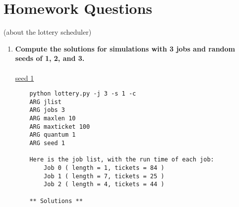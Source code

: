 \documentclass{article}
\begin{document}
\section*{Homework Questions}

(about the lottery scheduler)

\begin{enumerate}

    \item \textbf{Compute the solutions for simulations with 3 jobs and random seeds of 1, 2, and 3.}\\\\
    \underline{seed 1}
    \begin{verbatim}
    python lottery.py -j 3 -s 1 -c
    ARG jlist 
    ARG jobs 3
    ARG maxlen 10
    ARG maxticket 100
    ARG quantum 1
    ARG seed 1
    
    Here is the job list, with the run time of each job: 
        Job 0 ( length = 1, tickets = 84 )
        Job 1 ( length = 7, tickets = 25 )
        Job 2 ( length = 4, tickets = 44 )
    
    ** Solutions **
    

\end{verbatim}
\end{enumerate}
\end{document}
